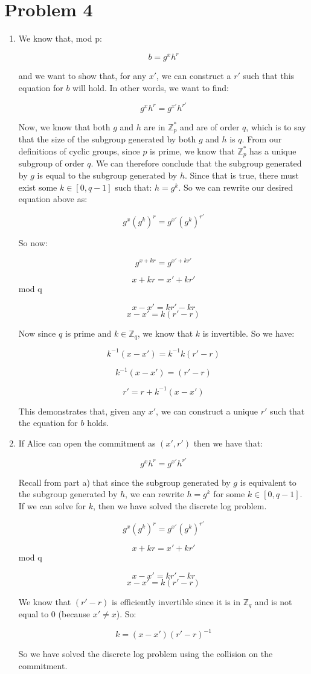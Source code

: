 \documentclass{article}
\begin{document}
\section*{Problem 4}

\begin{enumerate}
\item %
We know that, mod p:

$$b = g^x h^r$$

and we want to show that, for any $x'$, we can construct a $r'$ such that this equation for $b$ will hold. In other words, we want to find:

$$g^x h^r = g^{x'} h^{r'}$$

 Now, we know that both $g$ and $h$ are in $\mathbb{Z}_{p}^{*}$ and are of order $q$, which is to say that the size of the subgroup generated by both $g$ and $h$ is $q$. From our definitions of cyclic groups, since $p$ is prime, we know that $\mathbb{Z}_{p}^{*}$ has a unique subgroup of order $q$. We can therefore conclude that the subgroup generated by $g$ is equal to the subgroup generated by $h$. Since that is true, there must exist some $k \in [0, q-1]$ such that: $h = g^k$. So we can rewrite our desired equation above as:
 
$$g^x (g^k)^r = g^{x'} (g^k)^{r'} $$

So now:

$$g^{x + kr} = g^{x' + kr'} $$

$$x + kr = x' + kr' $$mod q

$$x - x' = kr' - kr $$
$$x - x' = k(r' - r) $$

Now since $q$ is prime and $k \in \mathbb{Z}_{q}$, we know that $k$ is invertible. So we have:

$$k^{-1}(x - x') = k^{-1}k(r' - r) $$

$$k^{-1}(x - x') = (r' - r) $$

$$r' = r + k^{-1}(x - x')$$

This demonstrates that, given any $x'$, we can construct a unique $r'$ such that the equation for $b$ holds.

\item %
If Alice can open the commitment as $(x', r')$ then we have that:

$$g^x h^r = g^{x'} h^{r'}$$

Recall from part a) that since the subgroup generated by $g$ is equivalent to the subgroup generated by $h$, we can rewrite $h = g^k$ for some $k \in [0, q-1]$. If we can solve for $k$, then we have solved the discrete log problem.

$$g^x (g^k)^r = g^{x'} (g^k)^{r'} $$

$$x + kr = x' + kr' $$mod q

$$x - x' = kr' - kr $$
$$x - x' = k(r' - r) $$

We know that $(r' - r)$ is efficiently invertible since it is in $\mathbb{Z}_{q}$ and is not equal to 0 (because $x' \neq x$). So:

$$k = (x - x')(r' - r)^{-1} $$

So we have solved the discrete log problem using the collision on the commitment. 

\end{enumerate}
\end{document}
